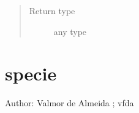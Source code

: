 \documentclass[letterpaper,10pt,openany,oneside,english]{sphinxmanual}
\begin{document}
\begin{fulllineitems}
\begin{fulllineitems}
\begin{quote}
\begin{description}
\item[{Return type}] \leavevmode
any type

\end{description}\end{quote}

\end{fulllineitems}


\end{fulllineitems}



\section{specie}
\label{\detokenize{support_rst/specie:module-specie}}\label{\detokenize{support_rst/specie:specie}}\label{\detokenize{support_rst/specie::doc}}
Author: Valmor de Almeida ; vfda
\end{document}
